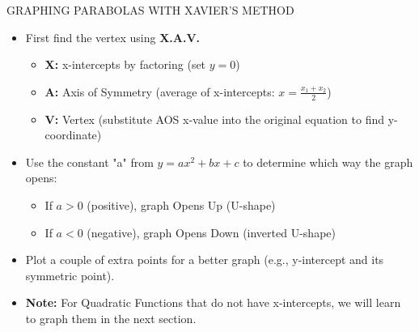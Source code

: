 \documentclass[aspectratio=169]{beamer}
\begin{document}
\begin{frame}{GRAPHING PARABOLAS WITH XAVIER'S METHOD}
    \begin{tcolorbox}[colback=lightgray,colframe=primary,title=Xavier's Method Steps]
        \footnotesize
        \begin{itemize}
            \item First find the vertex using \textcolor{accent}{\textbf{X.A.V.}}
            \begin{itemize}
                \item \textbf{X:} x-intercepts by factoring (set $y=0$)
                \item \textbf{A:} Axis of Symmetry (average of x-intercepts: $x = \frac{x_1 + x_2}{2}$)
                \item \textbf{V:} Vertex (substitute AOS x-value into the original equation to find y-coordinate)
            \end{itemize}
            \item Use the constant "a" from $y=ax^2+bx+c$ to determine which way the graph opens:
            \begin{itemize}
                \item If $a > 0$ (positive), graph Opens Up (U-shape)
                \item If $a < 0$ (negative), graph Opens Down (inverted U-shape)
            \end{itemize}
            \item Plot a couple of extra points for a better graph (e.g., y-intercept and its symmetric point).
            \item \textbf{Note:} For Quadratic Functions that do not have x-intercepts, we will learn to graph them in the next section.
        \end{itemize}
    \end{tcolorbox}
\end{frame}
\end{document}
